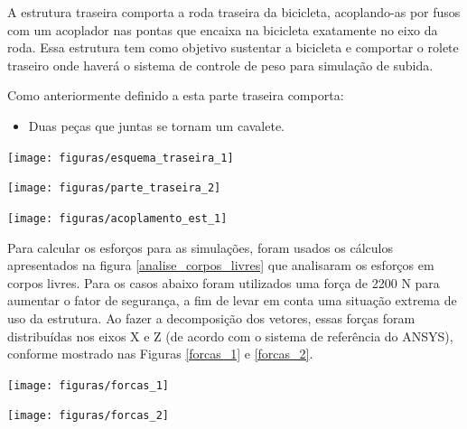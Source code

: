     A estrutura traseira comporta a roda traseira da bicicleta, acoplando-as por fusos com um acoplador nas pontas que encaixa na bicicleta exatamente no eixo da roda. Essa estrutura tem como objetivo sustentar a bicicleta e comportar o rolete traseiro onde haverá o sistema de controle de peso para simulação de subida.

    Como anteriormente definido a esta parte traseira comporta:
    \begin{itemize}
        \item Duas peças que juntas se tornam um cavalete.
    \end{itemize}

    \begin{center}
    	\texttt{[image: figuras/esquema\_traseira\_1]}
        \label{esquema_traseira_1}
    \end{center}

    \begin{center}
    	\texttt{[image: figuras/parte\_traseira\_2]}
        \label{parte_traseira_2}
    \end{center}

    \begin{center}
    	\texttt{[image: figuras/acoplamento\_est\_1]}
        \label{acoplamento_est_1}
    \end{center}

    Para calcular os esforços para as simulações, foram usados os cálculos apresentados na figura \ref{analise_corpos_livres} que analisaram os esforços em corpos livres. Para os casos abaixo foram utilizados uma força de 2200 N para aumentar o fator de segurança, a fim de levar em conta uma situação extrema de uso da estrutura. Ao fazer a decomposição dos vetores, essas forças foram distribuídas nos eixos X e Z (de acordo com o sistema de referência do ANSYS), conforme mostrado nas Figuras \ref{forcas_1} e \ref{forcas_2}.

    \begin{center}
    	\texttt{[image: figuras/forcas\_1]}
        \label{forcas_1}
    \end{center}

    \begin{center}
    	\texttt{[image: figuras/forcas\_2]}
        \label{forcas_2}
    \end{center}

